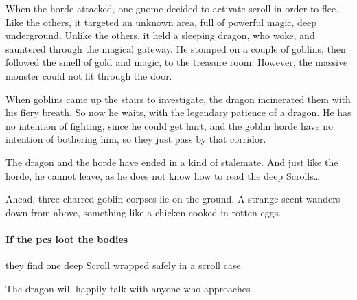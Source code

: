 \begin{multicols}{2}

\begin{exampletext}
  When the horde attacked, one gnome decided to activate  scroll in order to flee.
  Like the others, it targeted an unknown area, full of powerful magic, deep underground.
  Unlike the others, it held a sleeping dragon, who woke, and sauntered through the magical gateway.
  He stomped on a couple of goblins, then followed the smell of gold and magic, to the treasure room.
  However, the massive monster could not fit through the door.

  When goblins came up the stairs to investigate, the dragon incinerated them with his fiery breath.
  So now he waits, with the legendary patience of a dragon.
  He has no intention of fighting, since he could get hurt, and the goblin horde have no intention of bothering him, so they just pass by that corridor.

  The dragon and the horde have ended in a kind of stalemate.
  And just like the horde, he cannot leave, as he does not know how to read the \Gls{deep} Scrolls\ldots
\end{exampletext}

\begin{boxtext}
  Ahead, three charred goblin corpses lie on the ground.
  A strange scent wanders down from above, something like a chicken cooked in rotten eggs.
\end{boxtext}

\paragraph{If the \glspl{pc} loot the bodies}
they find one \Gls{deep} Scroll wrapped safely in a scroll case.


The dragon will happily talk with anyone who approaches%
\iftoggle{hardcore}{, although he only speaks Gnollish and Elvish.}{
  The dragon's eventual goal is to obtain the rest of the treasure, then leave the \gls{warren}, and go somewhere he can spread his wings.
  Like all dragons, he has more cunning than ferocity, and \emph{plenty} of both.
  He will look for opportunities to turn the \glspl{pc} against each other, and reframe all conversations around the assumption that he will soon leave, with most of the treasure, through \pgls{deep} scroll, and that the \glspl{pc} should view this as their best possible outcome.

}
\end{multicols}
